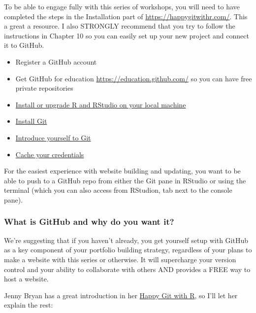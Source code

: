 \documentclass[
]{article}
\providecommand{\tightlist}{%
  \setlength{\itemsep}{0pt}\setlength{\parskip}{0pt}}
\begin{document}
To be able to engage fully with this series of workshops, you will need to have completed the steps in the Installation part of
\url{https://happygitwithr.com/}. This a great a resource. I also STRONGLY recommend that you try to follow the instructions in Chapter 10 so you can easily set up your new project and connect it to GitHub.

\begin{itemize}
\tightlist
\item
  Register a GitHub account
\item
  Get GitHub for education
  \url{https://education.github.com/} so you can have free private
  repositories
\item
  \href{https://happygitwithr.com/install-r-rstudio.html}{Install or upgrade R and
  RStudio on your local machine}
\item
  \href{https://happygitwithr.com/install-git.html}{Install Git}
\item
  \href{https://happygitwithr.com/hello-git.html}{Introduce yourself to Git}
\item
  \href{https://happygitwithr.com/credential-caching.html}{Cache your credentials}
\end{itemize}

For the easiest experience with website building and updating, you want to be able to push to a GitHub repo from either the Git pane in RStudio or using the terminal (which you can also access from RStudion, tab next to the console pane).

\hypertarget{what-is-github-and-why-do-you-want-it}{%
\subsubsection{What is GitHub and why do you want it?}\label{what-is-github-and-why-do-you-want-it}}

We're suggesting that if you haven't already, you get yourself setup with GitHub as a key component of your portfolio building strategy, regardless of your plans to make a website with this series or otherwise. It will supercharge your version control and your ability to collaborate with others AND provides a FREE way to host a website.

Jenny Bryan has a great introduction in her \href{https://happygitwithr.com}{Happy Git with R}, so I'll let her explain the rest:
\end{document}
